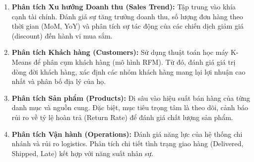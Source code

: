 \begin{enumerate}
    \item \textbf{Phân tích Xu hướng Doanh thu (Sales Trend):} 
    Tập trung vào khía cạnh tài chính. Đánh giá sự tăng trưởng doanh thu, số lượng đơn hàng theo thời gian (MoM, YoY) và phân tích sự tác động của các chiến dịch giảm giá (discount) đến hành vi mua sắm.
    
    \item \textbf{Phân tích Khách hàng (Customers):}
    Sử dụng thuật toán học máy K-Means để phân cụm khách hàng (mô hình RFM). Từ đó, đánh giá giá trị dòng đời khách hàng, xác định các nhóm khách hàng mang lại lợi nhuận cao nhất và phân bố địa lý của họ.
    
    \item \textbf{Phân tích Sản phẩm (Products):}
    Đi sâu vào hiệu suất bán hàng của từng danh mục và nguồn cung. Đặc biệt, mục tiêu trọng tâm là theo dõi, cảnh báo rủi ro về tỷ lệ hoàn trả (Return Rate) để đánh giá chất lượng sản phẩm.
    
    \item \textbf{Phân tích Vận hành (Operations):}
    Đánh giá năng lực của hệ thống chi nhánh và rủi ro logistics. Phân tích chi tiết tình trạng giao hàng (Delivered, Shipped, Late) kết hợp với năng suất nhân sự.
\end{enumerate}